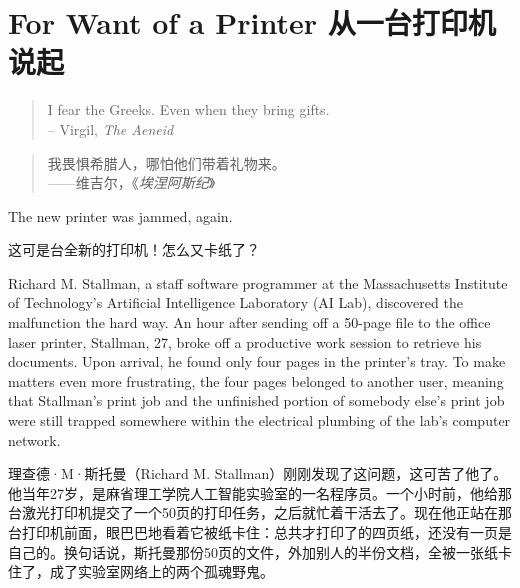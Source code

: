 \chapter{\ifdefined\eng
For Want of a Printer
\fi
\ifdefined\chs
从一台打印机说起
\fi
}
\thispagestyle{empty}
\ifdefined\eng
\begin{quotation}
  \begin{flushright}
    I fear the Greeks. Even when they bring gifts.\\
    -- Virgil, \textit{The Aeneid}
  \end{flushright}
\end{quotation}
\fi

\ifdefined\chs
\begin{quotation}
  \begin{flushright}
   我畏惧希腊人，哪怕他们带着礼物来。\\
    ——维吉尔，《\textit{埃涅阿斯纪}》
  \end{flushright}
\end{quotation}
\fi

\ifdefined\eng
The new printer was jammed, again.
\fi

\ifdefined\chs
这可是台全新的打印机！怎么又卡纸了？
\fi

\ifdefined\eng
Richard M. Stallman, a staff software programmer at the Massachusetts Institute of Technology's Artificial Intelligence Laboratory (AI Lab), discovered the malfunction the hard way. An hour after sending off a 50-page file to the office laser printer, Stallman, 27, broke off a productive work session to retrieve his documents. Upon arrival, he found only four pages in the printer's tray. To make matters even more frustrating, the four pages belonged to another user, meaning that Stallman's print job and the unfinished portion of somebody else's print job were still trapped somewhere within the electrical plumbing of the lab's computer network.
\fi

\ifdefined\chs
理查德·M·斯托曼（Richard M. Stallman）刚刚发现了这问题，这可苦了他了。他当年27岁，是麻省理工学院人工智能实验室的一名程序员。一个小时前，他给那台激光打印机提交了一个50页的打印任务，之后就忙着干活去了。现在他正站在那台打印机前面，眼巴巴地看着它被纸卡住：总共才打印了的四页纸，还没有一页是自己的。换句话说，斯托曼那份50页的文件，外加别人的半份文档，全被一张纸卡住了，成了实验室网络上的两个孤魂野鬼。
\fi

